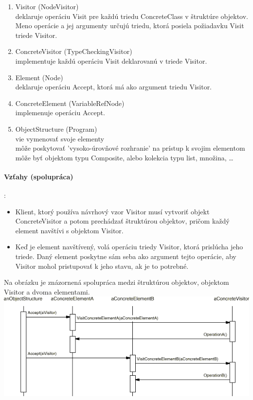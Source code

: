 			\begin{enumerate}
				\item Visitor (NodeVisitor)\\
					deklaruje operáciu Visit pre každú triedu ConcreteClass v štruktúre objektov. Meno operácie a jej argumenty určujú triedu, ktorá posiela požiadavku Visit triede Visitor.
				\item ConcreteVisitor (TypeCheckingVisitor)\\
					implementuje každú operáciu Visit deklarovanú v triede Visitor.
				\item Element (Node)\\
					deklaruje operáciu Accept, ktorá má ako argument triedu Visitor.
				\item ConcreteElement (VariableRefNode)\\
					implemenuje operáciu Accept.
				\item ObjectStructure (Program)\\
					vie vymenovať svoje elementy\\
					môže poskytovať 'vysoko-úrovňové rozhranie' na prístup k svojim elementom\\
					môže byť objektom typu Composite, alebo kolekcia typu list, množina, …
			\end{enumerate}

		\paragraph{Vzťahy (spolupráca)}:\\
			\begin{itemize}
				\item Klient, ktorý používa návrhový vzor Visitor musí vytvoriť objekt ConcreteVisitor a potom prechádzať štruktúrou objektov, pričom každý element navštívi s objektom Visitor.
				\item Keď je element navštívený, volá operáciu triedy Visitor, ktorá prislúcha jeho triede. Daný element poskytne sám seba ako argument tejto operácie, aby Visitor mohol pristupovať k jeho stavu, ak je to potrebné.
			\end{itemize}
			Na obrázku je znázornená spolupráca medzi štruktúrou objektov, objektom Visitor a dvoma elementami.\\


			\includegraphics[width=.9\textwidth]{images/visitor4}

